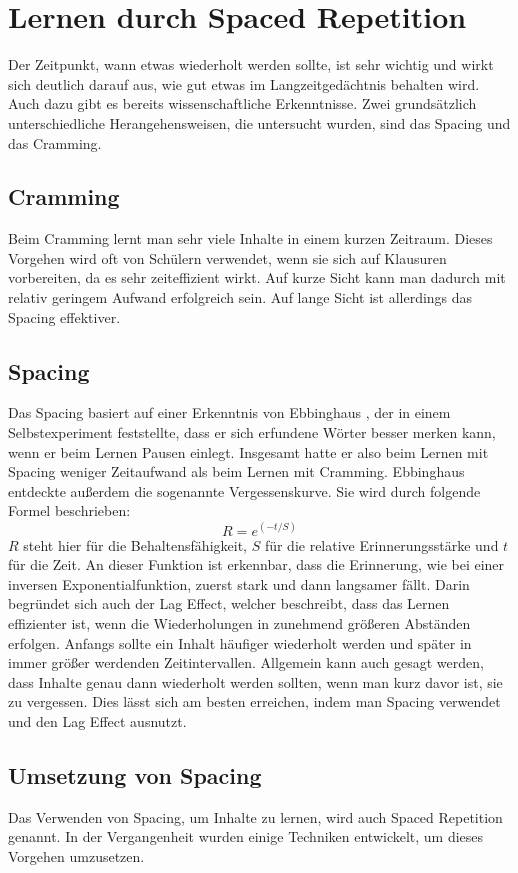 \section{Lernen durch Spaced Repetition}
Der Zeitpunkt, wann etwas wiederholt werden sollte, ist sehr wichtig und wirkt sich deutlich darauf aus, wie gut etwas im Langzeitgedächtnis behalten wird. Auch dazu gibt es bereits wissenschaftliche Erkenntnisse.
Zwei grundsätzlich unterschiedliche Herangehensweisen, die untersucht wurden, sind das Spacing und das Cramming.

\subsection{Cramming}
Beim Cramming lernt man sehr viele Inhalte in einem kurzen Zeitraum. Dieses Vorgehen wird oft von Schülern verwendet, wenn sie sich auf Klausuren vorbereiten, da es sehr zeiteffizient wirkt. Auf kurze Sicht kann man dadurch mit relativ geringem Aufwand erfolgreich sein. Auf lange Sicht ist allerdings das Spacing effektiver.
\cite{schimanke_spaced_2017}

\subsection{Spacing}
\label{cp:Spacing}
Das Spacing basiert auf einer Erkenntnis von Ebbinghaus \cite{hermann_ebbinghaus_uber_1885}, der in einem Selbstexperiment feststellte, dass er sich erfundene Wörter besser merken kann, wenn er beim Lernen Pausen einlegt. Insgesamt hatte er also beim Lernen mit Spacing weniger Zeitaufwand als beim Lernen mit Cramming. Ebbinghaus entdeckte außerdem die sogenannte Vergessenskurve.
Sie wird durch folgende Formel beschrieben:
$$R = e^{(-t/S)}$$
$R$ steht hier für die Behaltensfähigkeit, $S$ für die relative Erinnerungsstärke und $t$ für die Zeit.
An dieser Funktion ist erkennbar, dass die Erinnerung, wie bei einer inversen Exponentialfunktion, zuerst stark und dann langsamer fällt. Darin begründet sich auch der Lag Effect, welcher beschreibt, dass das Lernen effizienter ist, wenn die Wiederholungen in zunehmend größeren Abständen erfolgen. Anfangs sollte ein Inhalt häufiger wiederholt werden und später in immer größer werdenden Zeitintervallen. Allgemein kann auch gesagt werden, dass Inhalte genau dann wiederholt werden sollten, wenn man kurz davor ist, sie zu vergessen. Dies lässt sich am besten erreichen, indem man Spacing verwendet und den Lag Effect ausnutzt.
\cite{schimanke_spaced_2017}

\subsection{Umsetzung von Spacing}
\label{cp:halbwertszeitregression}
Das Verwenden von Spacing, um Inhalte zu lernen, wird auch Spaced Repetition genannt. In der Vergangenheit wurden einige Techniken entwickelt, um dieses Vorgehen umzusetzen.


